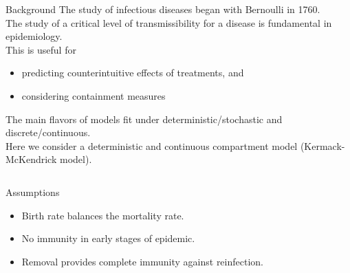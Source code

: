 \begin{slide}{Background}
The study of infectious diseases began with Bernoulli in 1760. \\
The study of a critical level of transmissibility for a disease is fundamental in epidemiology. \\
This is useful for
\begin{itemize}
	\item predicting counterintuitive effects of treatments, and
	\item considering containment measures
\end{itemize}
\vfill
The main flavors of models fit under deterministic/stochastic and discrete/continuous. \\

Here we consider a deterministic and continuous compartment model (Kermack-McKendrick model). \\
\begin{columns}[T]
\begin{column}{.6\textwidth}
	\begin{block}{Assumptions}
		\begin{itemize}
			\item Birth rate balances the mortality rate.
			\item No immunity in early stages of epidemic.
			\item Removal provides complete immunity against reinfection.
		\end{itemize}
	\end{block}
\end{column}
\end{columns}

\end{slide}